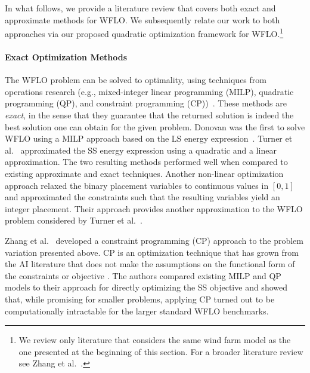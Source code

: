 \documentclass[preprint,12pt]{elsarticle}
\begin{document}
In what follows, we provide a literature review that covers both exact and approximate methods for WFLO. We subsequently relate our 
work to both approaches via our proposed quadratic optimization framework for WFLO.\footnote{We review 
only literature that considers the same wind farm model as the one presented at the beginning of this section. For a broader literature review see Zhang et al.\ \cite{Zhang2014}.} 
 
\paragraph{Exact Optimization Methods} 
The WFLO problem can be solved  
to optimality, using
techniques from operations research (e.g., mixed-integer linear programming (MILP), quadratic programming (QP), and constraint programming (CP))~\cite{Zhang2014,turner2014new,donovan2005wind}.
These methods are \emph{exact}, in the sense that they guarantee that the returned solution is indeed
the best solution one can obtain for the given problem. Donovan was the first to solve WFLO using a
MILP approach based on the LS energy expression~\cite{donovan2005wind}. Turner et al.\ \cite{turner2014new} approximated the SS energy expression using a quadratic and a linear approximation. The two resulting methods performed well when
compared to existing approximate and exact techniques.
Another non-linear optimization approach \cite{ulku2019new} relaxed the binary placement variables to continuous values in $[0,1]$
and approximated the constraints such that the resulting variables yield an integer placement.
Their approach provides another approximation to the WFLO problem considered by Turner et al.\ \cite{turner2014new}.

Zhang et al.\ \cite{Zhang2014} developed a constraint programming (CP) approach to the problem variation presented above. CP is an optimization technique that has grown from the AI literature that does not make the assumptions on the functional form of the constraints or objective \cite{rossi2006handbook}. The authors compared existing MILP and QP models to their approach for directly optimizing the SS objective and showed that, while promising for smaller problems, applying CP turned out to be computationally intractable for the larger standard WFLO benchmarks. 

\end{document}
